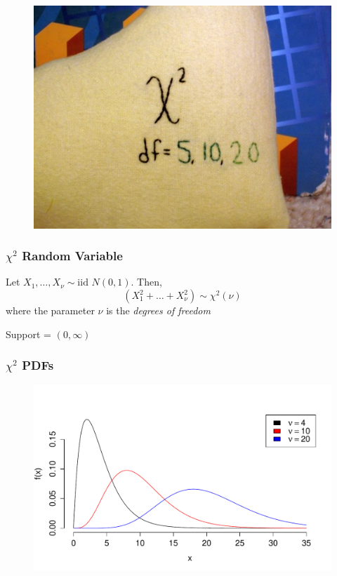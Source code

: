 \documentclass[handout]{beamer}
\begin{document}
\begin{frame}
\begin{figure}
\includegraphics[scale = 0.45]{./images/chisq_etsy2}
\end{figure}
\end{frame}
\begin{frame}
\frametitle{$\chi^2$ Random Variable}
Let $X_1, \hdots, X_\nu \sim \mbox{iid } N(0,1)$. Then,
	$$\left(X_1^2 + \hdots + X_\nu^2  \right)\sim \chi^2(\nu)$$
	where the parameter $\nu$ is the \emph{degrees of freedom}
	
	\vspace{1em}
	\pause
	\alert{Support = $(0, \infty)$}\\
	\vspace{1em}
\end{frame}





\begin{frame}
\frametitle{$\chi^2$ PDFs}

\begin{figure}
\includegraphics[scale = 0.58]{./images/chisq}
\end{figure}
\end{frame}
\end{document}
